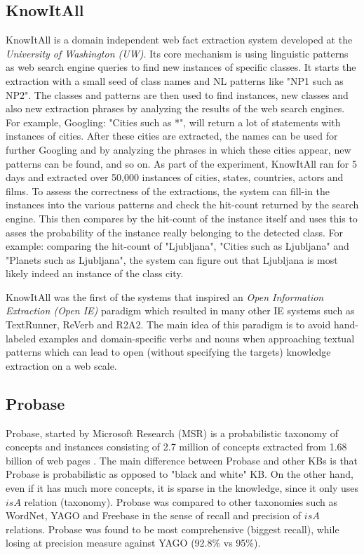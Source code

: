 \subsection{KnowItAll}
\label{section:r:knowitall}
KnowItAll \parencite{Etzioni2004} is a domain independent web fact extraction 
system developed at the \emph{University of Washington (UW)}. Its core mechanism is using linguistic patterns as web search engine queries to find new instances of specific classes. It starts the extraction with a small seed of class names and NL patterns like "NP1 such as NP2". The classes and patterns are then used to find instances,
new classes and also new extraction phrases by analyzing the results of the 
web search engines. For example, Googling: "Cities such as *", will return 
a lot of statements with instances of cities. After these cities are extracted,
the names can be used for further Googling and by analyzing the phrases in which
these cities appear, new patterns can be found, and so on. As part of the
experiment, KnowItAll ran for 5 days and extracted over 50,000 instances of
cities, states, countries, actors and films.
To assess the correctness of the extractions, the system can fill-in the instances into the various patterns and check the hit-count returned by the search engine. This then compares by the hit-count of the instance itself and uses this to
asses the probability of the instance really belonging to the detected class.
For example: comparing the hit-count of "Ljubljana", "Cities such as Ljubljana"
and "Planets such as Ljubljana", the system can figure out that Ljubljana is
most likely indeed an instance of the class city.

KnowItAll was the first of the systems that inspired an \emph{Open Information
Extraction (Open IE)} paradigm \parencite{Etzioni2011} which resulted in many 
other IE systems such as TextRunner, ReVerb and R2A2. The main idea of this
paradigm is to avoid hand-labeled examples and domain-specific verbs and nouns
when approaching textual patterns which can lead to open (without specifying the
targets) knowledge extraction on a web scale.

\subsection{Probase}
\label{section:r:probase}
Probase, started by Microsoft Research (MSR) is a probabilistic taxonomy of 
concepts and instances consisting of
2.7 million of concepts extracted from 1.68 billion of web pages
\parencite{Wu2012}. The main difference between Probase and other KBs is that
Probase is probabilistic as opposed to "black and white" KB. On the other hand,
even if it has much more concepts, it is sparse in the knowledge, since it only
uses $isA$ relation (taxonomy). Probase was compared to other taxonomies such as
WordNet, YAGO and Freebase in the sense of recall and precision of $isA$ 
relations. Probase was found to be most comprehensive (biggest recall), while
losing at precision measure against YAGO (92.8\% vs 95\%). 

